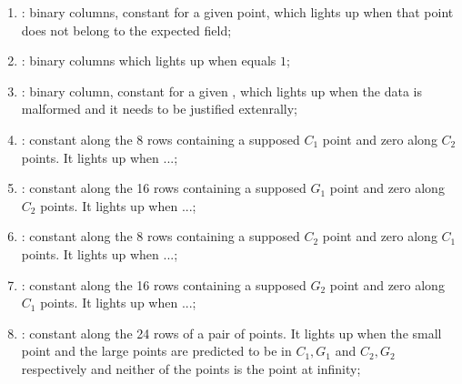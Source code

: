 \begin{enumerate}[resume]
      \item \both{\malformedDataBit} \blsPrediction{}: binary columns, constant for a given point, which lights up when that point does not belong to the expected field; %
      \item \both{\malformedDataAcc}: binary columns which lights up when \malformedDataBit{} equals $1$;              
      \item \both{\malformedDataExternalJustification}: binary column, constant for a given \blsId, which lights up when the data is malformed and it needs to be justified extenrally;
      
      \item \both{\cOneMembershipTestRequired}:
            constant along the 8 rows containing a supposed $C_1$ point and zero along $C_2$ points. It lights up when ...;
      \item \both{\gOneMembershipTestRequired}:
            constant along the 16 rows containing a supposed $G_1$ point and zero along $C_2$ points. It lights up when ...;
      \item \both{\cTwoMembershipTestRequired}:
            constant along the 8 rows containing a supposed $C_2$ point and zero along $C_1$ points. It lights up when ...;
      \item \both{\gTwoMembershipTestRequired}:
            constant along the 16 rows containing a supposed $G_2$ point and zero along $C_1$ points. It lights up when ...;
      \item \both{\acceptablePairOfPoints}: constant along the 24 rows of a pair of points. It lights up when the small point and the large points are predicted to be in $C_1,G_1$ and $C_2,G_2$ respectively and neither of the points is the point at infinity;
\end{enumerate}
     
